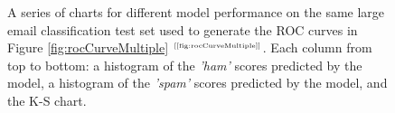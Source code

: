 \documentclass[xcolor={table}]{beamer}
\newcommand{\featL}[1]{\textit{'#1'}}
\newcommand{\ourRef}[1]{\ref{#1} $^{\text{\tiny[\pageref{#1}]}}$}
\begin{document}
\begin{frame} [plain]
\begin{figure}[!thb]
\begin{centering}
       \caption{A series of charts for different model performance on the same large email classification test set used to generate the ROC curves in Figure \ourRef{fig:rocCurveMultiple}. Each column from top to bottom: a histogram of the \featL{ham} scores predicted by the model, a histogram of the \featL{spam} scores predicted by the model, and the K-S chart.}
       \label{fig:bigKSExamples}
       \end{centering}
\end{figure}
\end{frame} 
\end{document}
